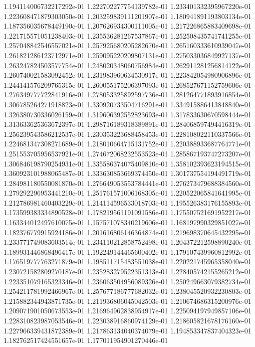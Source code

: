 1.194114006732217292e-01
1.222702277754139782e-01
1.233401332395967220e-01
1.223608471879303050e-01
1.203259839111201907e-01
1.180941891193803134e-01
1.187356035678449190e-01
1.207626934300111005e-01
1.217226865883409698e-01
1.221715571051238403e-01
1.235536281267537867e-01
1.252508435741741255e-01
1.257048842546557021e-01
1.257925680205282670e-01
1.265160333610939047e-01
1.261821286123712971e-01
1.259095220209807131e-01
1.275033036849927137e-01
1.263247824503577754e-01
1.248020348060756984e-01
1.262911281256814122e-01
1.260740021583092452e-01
1.231983960634530917e-01
1.223842054980906896e-01
1.244141576209765315e-01
1.260055175206397093e-01
1.268527671152759606e-01
1.276349777722841916e-01
1.278053325892597736e-01
1.281264771893916854e-01
1.306785264271918823e-01
1.330920733504716291e-01
1.334915886413848840e-01
1.326380730336026159e-01
1.319606392552823693e-01
1.317833630670598444e-01
1.313633625363672397e-01
1.298716189318389891e-01
1.284068597494416319e-01
1.256239543586212537e-01
1.230353223688458453e-01
1.228108022110337566e-01
1.224681347308271689e-01
1.218010664715131752e-01
1.220388933687764771e-01
1.251553705956537921e-01
1.274672068232553523e-01
1.285867193747273207e-01
1.306846198790254931e-01
1.335586374075409810e-01
1.358102393623194515e-01
1.360923101988065487e-01
1.333630853669374450e-01
1.301737554194491719e-01
1.284981180550081870e-01
1.276649053553784441e-01
1.276273479688384560e-01
1.279292296953441210e-01
1.251761571006168305e-01
1.220522065841641995e-01
1.212786981460403229e-01
1.214114596533018703e-01
1.195526383176155893e-01
1.173599383334890528e-01
1.178219561191091586e-01
1.175507521691952217e-01
1.163344012497610075e-01
1.157571078340219606e-01
1.168197990329851027e-01
1.182376779915924186e-01
1.201616806146364874e-01
1.219698370645432295e-01
1.233771749083603514e-01
1.234110212858752498e-01
1.204372212598890240e-01
1.189931446868496417e-01
1.192249144465600402e-01
1.179107439960812992e-01
1.176519777763271879e-01
1.198511715483551038e-01
1.220221745965358040e-01
1.230721582809270187e-01
1.235283279522351313e-01
1.228405742155265212e-01
1.223351079165323346e-01
1.236063504956089326e-01
1.250249663079382734e-01
1.254211781992466967e-01
1.257677186777682032e-01
1.238045520932230803e-01
1.215882344943871735e-01
1.211936806045042503e-01
1.210674686315200976e-01
1.209071901050673553e-01
1.216964962838954917e-01
1.225094197949857106e-01
1.228310823987053546e-01
1.223038916860974129e-01
1.218605821678176160e-01
1.227966339431872389e-01
1.217863134040374079e-01
1.194853347837404323e-01
1.182762517424551657e-01
1.177011954901270446e-01
